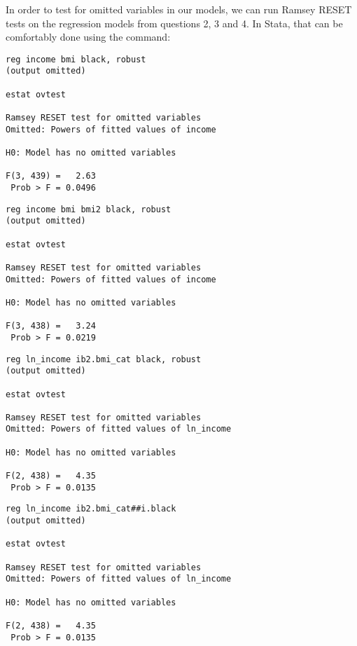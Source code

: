

In order to test for omitted variables in our models, we can run Ramsey RESET tests on the regression models from questions 2, 3 and 4. In Stata, that can be comfortably done using the  command:

\begin{verbatim}
reg income bmi black, robust
(output omitted)

estat ovtest

Ramsey RESET test for omitted variables
Omitted: Powers of fitted values of income

H0: Model has no omitted variables

F(3, 439) =   2.63
 Prob > F = 0.0496
\end{verbatim}

\begin{verbatim}
reg income bmi bmi2 black, robust
(output omitted)

estat ovtest

Ramsey RESET test for omitted variables
Omitted: Powers of fitted values of income

H0: Model has no omitted variables

F(3, 438) =   3.24
 Prob > F = 0.0219
\end{verbatim}

\newpage

\begin{verbatim}
reg ln_income ib2.bmi_cat black, robust
(output omitted)

estat ovtest

Ramsey RESET test for omitted variables
Omitted: Powers of fitted values of ln_income

H0: Model has no omitted variables

F(2, 438) =   4.35
 Prob > F = 0.0135
\end{verbatim}

\begin{verbatim}
reg ln_income ib2.bmi_cat##i.black
(output omitted)

estat ovtest

Ramsey RESET test for omitted variables
Omitted: Powers of fitted values of ln_income

H0: Model has no omitted variables

F(2, 438) =   4.35
 Prob > F = 0.0135
\end{verbatim}

